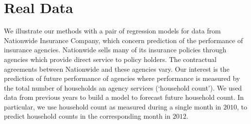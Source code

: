 \documentclass[12pt]{article}
\newcommand{\by}{\mbox{\boldmath $y$}}
\begin{document}
\section{Real Data}
\label{Real Data}
We illustrate our methods with a pair of regression models for data from Nationwide Insurance Company, which concern prediction of the performance of insurance agencies.
%
Nationwide sells many of its insurance policies through agencies which provide direct service to policy holders.  
The contractual agreements between Nationwide and these agencies vary.  Our interest is the prediction of future performance of agencies where  performance is measured by the total number of households an agency services (`household count'). 
We used data from previous years to build a model to forecast future household count. In particular, we use household count  as measured during a single month in $2010$, to predict household counts in the corresponding month in $2012$.  
\end{document}

